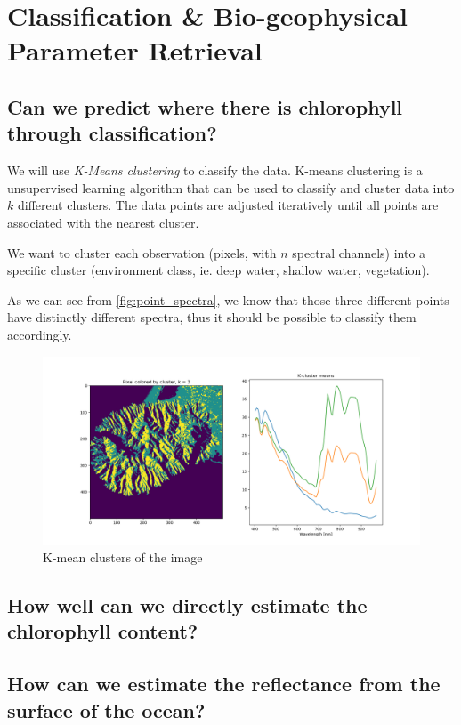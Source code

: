 \section{Classification \& Bio-geophysical Parameter Retrieval}

\subsection{Can we predict where there is chlorophyll through classification?}

We will use \textit{K-Means clustering} to classify the data. K-means clustering is a 
unsupervised learning algorithm that can be used to classify and cluster data into $k$ 
different clusters. The data points are adjusted iteratively until all points are 
associated with the nearest cluster.

We want to cluster each observation (pixels, with $n$ spectral channels) into a specific 
cluster (environment class, ie. deep water, shallow water, vegetation). 

As we can see from \cref{fig:point_spectra}, we know that those three different points 
have distinctly different spectra, thus it should be possible to classify them accordingly. 

\begin{figure}
    \centering
    \includegraphics[width=\textwidth]{../fig/kmean/kmean_3.png}
    \caption{K-mean clusters of the image}
    \label{fig:kmean}
\end{figure}


\subsection{How well can we directly estimate the chlorophyll content?}

\subsection{How can we estimate the reflectance from the surface of the ocean?}

